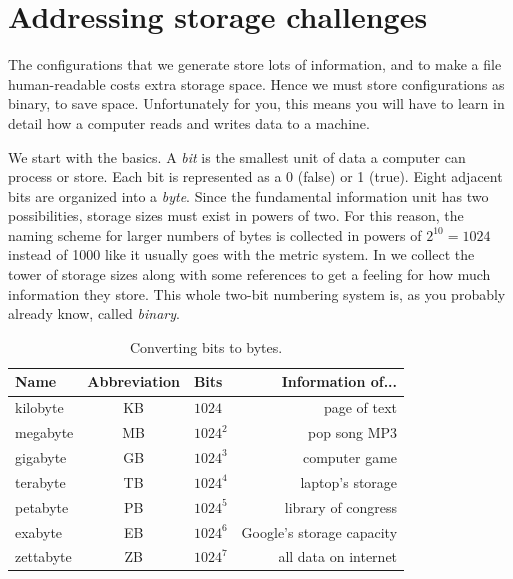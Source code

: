 \begin{code*}
\end{code*}
\begin{code*}
\end{code*}


\section{Addressing storage challenges}

The configurations that we generate store lots of information, and to make a
file human-readable costs extra storage space. Hence we must store
configurations as binary, to save space. Unfortunately for you,
this means you will have to learn in detail how a computer reads and writes data
to a machine.

We start with the basics. A {\it bit} is the smallest unit of data a computer
can process or store. Each bit is represented as a 0 (false) or 1 (true).
Eight adjacent bits are organized into a {\it byte}.
Since the fundamental information unit has two possibilities, storage
sizes must exist in powers of two. For this reason, the naming scheme
for larger numbers of bytes is collected in powers of $2^{10}=1024$
instead of 1000 like it usually goes with the metric system.
In  we collect the tower of storage sizes
along with some references to get a feeling for how much information
they store. This whole two-bit numbering system is, as you probably
already know, called {\it binary}.

\begin{table}
\centering
\caption{Converting bits to bytes.}
\begin{tabularx}{\linewidth}{lCLr}
\hline\hline
Name & Abbreviation & Bits & Information of...\\
\hline
kilobyte & KB & $1024$ & page of text \\
megabyte & MB & $1024^2$ & pop song MP3 \\
gigabyte & GB & $1024^3$ & computer game \\
terabyte & TB & $1024^4$ & laptop's storage \\
petabyte & PB & $1024^5$ & library of congress \\
exabyte  & EB & $1024^6$ & Google's storage capacity \\
zettabyte  & ZB & $1024^7$ & all data on internet \\
\hline\hline
\end{tabularx}
\label{tab:byte}
\end{table}

